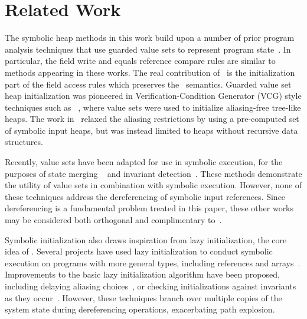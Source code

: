 \section{Related Work}
\label{sec:related}
%
The symbolic heap methods in this work build upon a
number of prior program analysis techniques that use guarded value sets to
represent program
state~\cite{Sen:2014,Torlak:2014,Xie:2005,Dillig:2011,Elkarablieh:2009}. In particular, the field write and equals reference compare rules are similar to methods appearing in these works. The real contribution of \symtxt\ is the initialization part of the field access rules which preserves the \gsetxt\ semantics.
Guarded value set heap initialization was pioneered in Verification-Condition Generator (VCG) style techniques such as ~\cite{Xie:2005}, where value sets were used to 
initialize aliasing-free tree-like heaps. The work in~\cite{Dillig:2011} relaxed the aliasing restrictions by using a pre-computed set of symbolic input heaps, but was instead limited to heaps without recursive data structures. 

Recently, value sets have been adapted for use in symbolic execution, for the purposes of state merging ~\cite{Sen:2014,Torlak:2014} and invariant detection~\cite{Ferrara:2014}. These methods demonstrate the utility of value sets in combination with symbolic execution. However, none of these techniques address the dereferencing of symbolic input references. Since dereferencing is a fundamental problem treated in this paper, these other works may be considered both orthogonal and complimentary to~\symtxt{}.

Symbolic initialization also draws inspiration from lazy initialization, the core idea of \gsetxt{}\cite{GSE03}. Several projects have used lazy initialization to conduct symbolic execution on programs with more general types,
including references and
arrays~\cite{KiasanKunit,Cadar:2008,Blackshear:2013,Filieri:2015}. Improvements to the basic lazy initialization algorithm have been proposed, including delaying aliasing choices~\cite{Deng:2007}, or checking initializations against invariants as they occur~\cite{Braione:2015,Rosner:2015}. However, these \gsetxt{} techniques branch over
multiple copies of the system state during dereferencing operations,
exacerbating path explosion.

